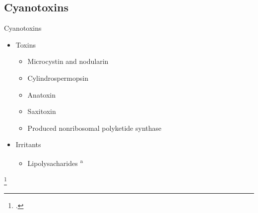 \subsection{Cyanotoxins}
\begin{frame}{Cyanotoxins}

	\begin{itemize}
		\item Toxins
			\begin{itemize} 
				\item Microcystin and nodularin %
  				\item Cylindrospermopsin 
				\item Anatoxin 
				\item Saxitoxin 
				\item Produced nonribosomal polyketide synthase
			\end{itemize}
		\item Irritants
			\begin{itemize}
				\item Lipolysacharides \textsuperscript{a}
			\end{itemize}

	\end{itemize}
	\footcitetext{[a], moore_richard_cyanobacterial_1993}
\end{frame}

